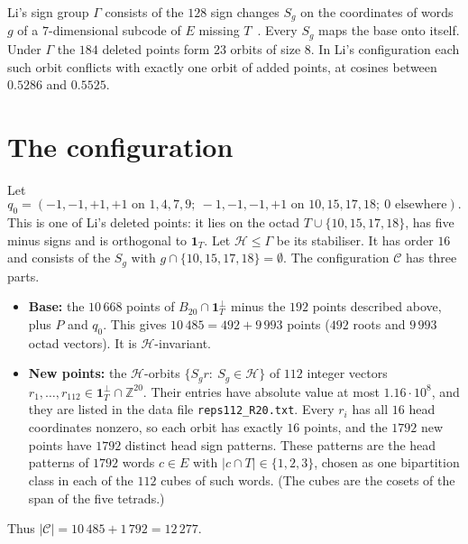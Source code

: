 \documentclass[11pt]{article}
\numberwithin{equation}{section}
\theoremstyle{definition}
\theoremstyle{remark}
\newcommand{\Z}{\mathbb Z}
\begin{document}
Li's sign group $\Gamma$ consists of the $128$ sign changes $S_g$ on the coordinates of words
$g$ of a $7$-dimensional subcode of $E$ missing $T$~\cite[\S3.2]{Li26b}. Every $S_g$ maps the base
onto itself. Under $\Gamma$ the $184$ deleted points form $23$ orbits of size $8$. In Li's
configuration each such orbit conflicts with exactly one orbit of added points, at cosines between
$0.5286$ and $0.5525$.

\section{The configuration}\label{sec:config}
Let
\[ q_0 = (-1,-1,+1,+1 \text{ on } 1,4,7,9;\ -1,-1,-1,+1 \text{ on } 10,15,17,18;\ 0 \text{ elsewhere}). \]
This is one of Li's deleted points: it lies on the octad $T\cup\{10,15,17,18\}$, has five minus signs
and is orthogonal to $\mathbf 1_T$. Let $\mathcal H\le\Gamma$ be its stabiliser. It has order $16$
and consists of the $S_g$ with $g\cap\{10,15,17,18\}=\emptyset$. The configuration $\mathcal C$ has
three parts.
\begin{itemize}
\item \textbf{Base:} the $10\,668$ points of $B_{20}\cap\mathbf 1_T^\perp$ minus the $192$ points
described above, plus $P$ and $q_0$. This gives $10\,485=492+9\,993$ points ($492$ roots and $9\,993$ octad
vectors). It is $\mathcal H$-invariant.
\item \textbf{New points:} the $\mathcal H$-orbits $\{S_g r:\ S_g\in\mathcal H\}$ of $112$ integer vectors
$r_1,\dots,r_{112}\in\mathbf 1_T^\perp\cap\Z^{20}$. Their entries have absolute value at most
$1.16\cdot10^{8}$, and they are listed in the data file \texttt{reps112\_R20.txt}. Every $r_i$ has all
$16$ head coordinates nonzero, so each orbit has exactly $16$ points, and the $1792$ new points have
$1792$ distinct head sign patterns. These patterns are the head patterns of $1792$ words $c\in E$
with $|c\cap T|\in\{1,2,3\}$, chosen as one bipartition class in each of the $112$ cubes of such
words. (The cubes are the cosets of the span of the five tetrads.)
\end{itemize}
Thus $|\mathcal C| = 10\,485+1\,792=12\,277$.
\end{document}
